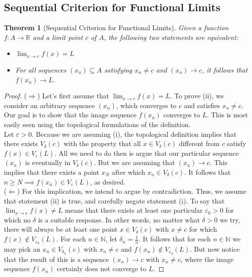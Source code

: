 \documentclass[10pt]{report}
\newtheorem{thm3}{Theorem}[subsection]
\newcommand{\eps}{\varepsilon}
\begin{document}
\subsection{Sequential Criterion for Functional Limits}
\begin{thm3}[Sequential Criterion for Functional Limits]
Given a function $f:A\to \mathbb{R}$ and a limit point $c$ of $A$, the following two statements are equivalent:
\begin{itemize}
\item[(i)] $\lim_{x\to c}f(x)=L$
\item[(ii)] For all sequences $(x_n)\subseteq A$ satisfying $x_n\neq c$ and $(x_n)\to c$, it follows that $f(x_n)\to L$.
\end{itemize}
\end{thm3}
\begin{proof}
($\Rightarrow$) Let's first assume that $\lim_{x\to c}f(x) = L$. To prove (ii), we consider an arbitrary sequence $(x_n)$, which converges to $c$ and satisfies $x_n\neq c$. Our goal is to show that the image sequence $f(x_n)$ converges to $L$. This is most easily seen using the topological formulations of the definition.\\
Let $\eps>0$. Because we are assuming (i), the topological definition implies that there exists $V_\delta(c)$ with the property that all $x\in V_\delta(c)$ different from $c$ satisfy $f(x)\in V_\eps(L)$. All we need to do then is argue that our particular sequence $(x_n)$ is eventually in $V_\delta(c)$. But we are assuming that $(x_n)\to c$. This implies that there exists a point $x_N$ after which $x_n\in V_\delta(c)$. It follows that $n\geq N\implies f(x_n)\in V_\eps(L)$, as desired.\\
($\Leftarrow$) For this implication, we intend to argue by contradiction. Thus, we assume that statement (ii) is true, and carefully negate statement (i). To say that $\lim_{x\to c}f(x)\neq L$ means that there exists at least one particular $\eps_0 >0$ for which no $\delta$ is a suitable response. In other words, no matter what $\delta>0$ we try, there will always be at least one point $x\in V_\delta(c)$ with $x\neq c$ for which $f(x)\notin V_{\eps_0}(L)$. For each $n\in\mathbb{N}$, let $\delta_n = \frac{1}{n}$. It follows that for each $n\in\mathbb{N}$ we may pick an $x_n\in V_{\delta_n}(c)$ with $x_n\neq c$ and $f(x_n)\notin V_{\eps_0}(L)$. But now notice that the result of this is a sequence $(x_n)\to c$ with $x_n\neq c$, where the image sequence $f(x_n)$ certainly does not converge to $L$.
\end{proof}
\end{document}
